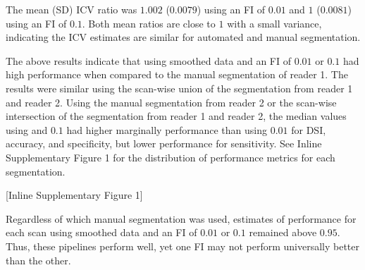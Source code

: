 The mean (SD) ICV ratio was $1.002$ ($0.0079$) using an FI of $0.01$ and $1$ ($0.0081$) using an FI of $0.1$.  Both mean ratios are close to $1$ with a small variance, indicating the ICV estimates are similar for automated and manual segmentation. 

The above results indicate that using smoothed data and an FI of $0.01$ or $0.1$ had high performance when compared to the manual segmentation of reader 1.  The results were similar using the scan-wise union of the segmentation from reader 1 and reader 2.  Using the manual segmentation from reader 2 or the scan-wise intersection of the segmentation from reader 1 and reader 2, the median values using and $0.1$ had higher marginally performance than using $0.01$ for DSI, accuracy, and specificity, but lower performance for sensitivity.  See Inline Supplementary Figure 1 for the distribution of performance metrics for each segmentation.

[Inline Supplementary Figure 1]

Regardless of which manual segmentation was used, estimates of performance for each scan using smoothed data and an FI of $0.01$ or $0.1$ remained above $0.95$.  Thus, these pipelines perform well, yet one FI may not perform universally better than the other.  

% 
% 












